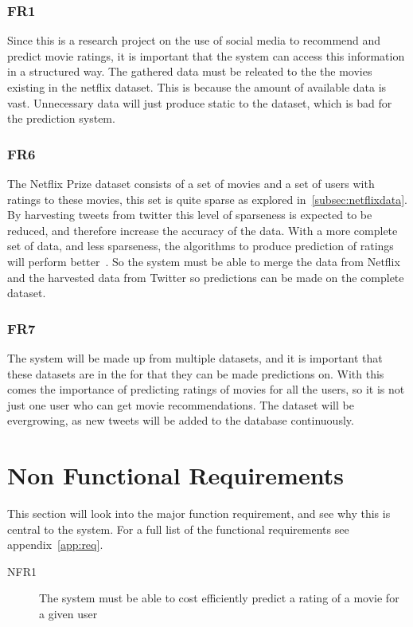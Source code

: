 \subsubsection{FR1}
Since this is a research project on the use of social media to recommend and predict movie ratings, it is important that the system can access this information in a structured way. The gathered data must be releated to the the movies existing in the netflix dataset. This is because the amount of available data is vast. Unnecessary data will just produce static to the dataset, which is bad for the prediction system.

\subsubsection{FR6}
The Netflix Prize dataset consists of a set of movies and a set of users with ratings to these movies, this set is quite sparse as explored in~\ref{subsec:netflixdata}. By harvesting tweets from twitter this level of sparseness is expected to be reduced, and therefore increase the accuracy of the data. With a more complete set of data, and less sparseness, the algorithms to produce prediction of ratings will perform better~\cite{grobelnikDataSparsityIssues}. So the system must be able to merge the data from Netflix and the harvested data from Twitter so predictions can be made on the complete dataset.

\subsubsection{FR7}
The system will be made up from multiple datasets, and it is important that these datasets are in the for that they can be made predictions on. With this comes the importance of predicting ratings of movies for all the users, so it is not just one user who can get movie recommendations. The dataset will be evergrowing, as new tweets will be added to the database continuously.

\section{Non Functional Requirements}\label{section:non-functional-requirements}
This section will look into the major function requirement, and see why this is central to the system. For a full list of the functional requirements see appendix~\ref{app:req}.
\begin{description}
  \item[NFR1] The system must be able to cost efficiently predict a rating of a movie for a given user
\end{description}


